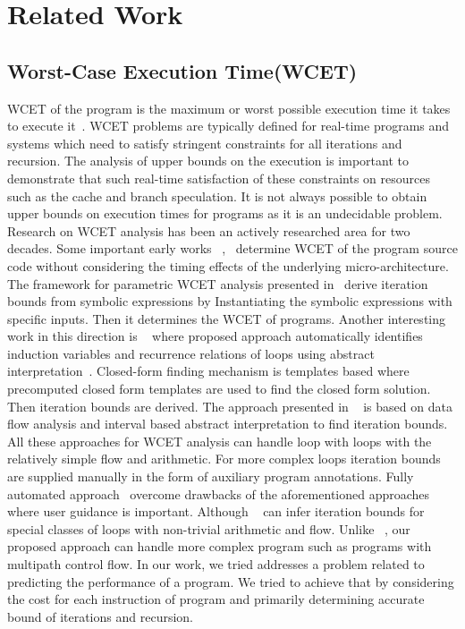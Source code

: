 \section{Related Work}
\label{sec:related}

\subsection{Worst-Case Execution Time(WCET)} 
WCET of the program is the maximum or worst possible execution time it takes to execute it~\cite{Wilhelm:2008:WEP:1347375.1347389}. WCET problems are typically defined for real-time programs and systems which need to satisfy stringent constraints for all iterations and recursion.
The analysis of upper bounds on the execution is important to demonstrate that such real-time satisfaction of these constraints on resources such as the cache and branch speculation. It is not always possible to obtain upper bounds on execution times for programs as it is an undecidable problem. Research on WCET analysis has been an actively researched area for two decades. Some important early works ~\cite{Puschner:1989:CME:84842.84850},~\cite{Zhang1993} determine WCET of the program source code without considering the timing effects of the underlying micro-architecture. The framework for parametric WCET analysis presented in~\cite{DBLP:conf/wcet/Lisper03} derive iteration bounds from symbolic expressions by Instantiating the symbolic expressions with specific inputs. Then it determines the WCET of programs. Another interesting work in this direction is ~\cite{4617284} where proposed approach automatically identifies induction variables and recurrence relations of loops using abstract interpretation~\cite{Ammarguellat:1990:ARI:93542.93583}. Closed-form finding mechanism is templates based where precomputed closed form templates are used to find the closed form solution. Then iteration bounds are derived. The approach presented in ~\cite{Prantltubound} is based on data flow analysis and interval based abstract interpretation to find iteration bounds. All these approaches for WCET analysis can handle loop with loops with the relatively simple flow and arithmetic.
For more complex loops iteration bounds are supplied manually in the form of auxiliary program annotations. Fully automated approach~\cite{Knoop:2011:SLB:2341512.2341532} overcome drawbacks of the aforementioned approaches where user guidance is important. Although ~\cite{Knoop:2011:SLB:2341512.2341532} can infer iteration bounds for special classes of loops with non-trivial arithmetic and flow. Unlike ~\cite{Knoop:2011:SLB:2341512.2341532}, our proposed approach can handle more complex program such as programs with multipath control flow. In our work, we tried addresses a problem related to predicting the performance of a program. We tried to achieve that by considering the cost for each instruction of program and primarily determining accurate bound of iterations and recursion.

